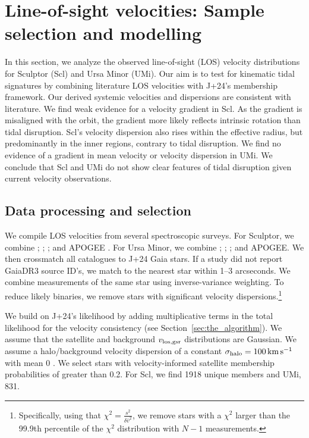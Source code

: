 \chapter{Line-of-sight velocities: Sample selection and
modelling}\label{sec:extra_rv_models}

In this section, we analyze the observed line-of-sight (LOS) velocity
distributions for Sculptor (Scl) and Ursa Minor (UMi). Our aim is to
test for kinematic tidal signatures by combining literature LOS
velocities with J+24's membership framework. Our derived systemic
velocities and dispersions are consistent with literature. We find weak
evidence for a velocity gradient in Scl. As the gradient is misaligned
with the orbit, the gradient more likely reflects intrinsic rotation
than tidal disruption. Scl's velocity dispersion also rises within the
effective radius, but predominantly in the inner regions, contrary to
tidal disruption. We find no evidence of a gradient in mean velocity or
velocity dispersion in UMi. We conclude that Scl and UMi do not show
clear features of tidal disruption given current velocity observations.

\section{Data processing and
selection}\label{data-processing-and-selection}

We compile LOS velocities from several spectroscopic surveys. For
Sculptor, we combine \citet{tolstoy+2023}; \citet{walker+2009};
\citet{sestito+2023a}; and APOGEE \citep[DR17,][]{abdurrouf+2022}. For
Ursa Minor, we combine \citet{spencer+2018}; \citet{pace+2020};
\citet{sestito+2023b}; and APOGEE. We then crossmatch all catalogues to
J+24 Gaia stars. If a study did not report GaiaDR3 source ID's, we match
to the nearest star within 1--3 arcseconds. We combine measurements of
the same star using inverse-variance weighting. To reduce likely
binaries, we remove stars with significant velocity
dispersions.\footnote{Specifically, using that
  \(\chi^2=\frac{s^2}{\delta \bar v^2}\), we remove stars with a
  \(\chi^2\) larger than the 99.9th percentile of the \(\chi^2\)
  distribution with \(N-1\) measurements.}

We build on J+24's likelihood by adding multiplicative terms in the
total likelihood for the velocity consistency (see
Section~\ref{sec:the_algorithm}). We assume that the satellite and
background \(v_{\rm los, gsr}\) distributions are Gaussian. We assume a
halo/background velocity dispersion of a constant
\(\sigma_{\rm halo} = 100\,{\rm km\,s^{-1}}\) with mean 0
\citep[e.g.][]{brown+2010}. We select stars with velocity-informed
satellite membership probabilities of greater than 0.2. For Scl, we find
1918 unique members and UMi, 831.

